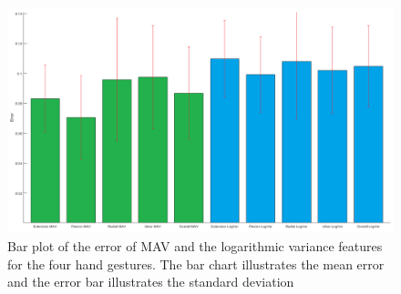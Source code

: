 \begin{figure}[H]
	\includegraphics[width=.4\textwidth]{figures/results/gimmeThemRMSEBars}  %
	\caption{Bar plot of the error of MAV and the logarithmic variance features for the four hand gestures. The bar chart illustrates the mean error and the error bar illustrates the standard deviation}
	\label{fig:gimmeThemRMSEBars}  %
\end{figure}